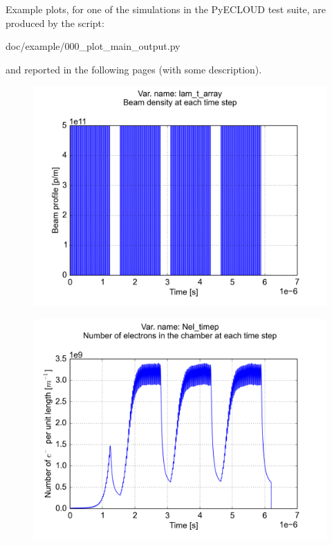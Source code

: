 \documentclass[a4paper,12pt]{article}
\begin{document}
Example plots, for one of the simulations in the PyECLOUD test suite, are produced by the script:

\hspace{1cm} doc/example/000\_plot\_main\_output.py

and reported  in the following pages (with some description).


\begin{figure}[p]
\begin{center}
\includegraphics[trim = 0 0 0 0, clip, width=.95\textwidth]{../../example/fig01.png}
\end{center}
\end{figure}

\begin{figure}[p]
\begin{center}
\includegraphics[trim = 0 0 0 0, clip, width=.95\textwidth]{../../example/fig02.png}
\end{center}
\end{figure}
\end{document}
